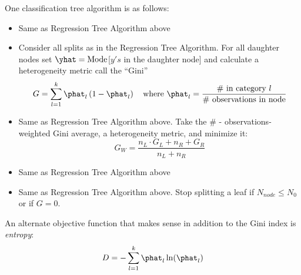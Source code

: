 \documentclass[12pt]{article}
\begin{document}
\begin{enumerate}
\begin{tcolorbox}[colback=white, sharp corners]
One classification tree algorithm is as follows:
\begin{itemize}
\item[\#1] Same as Regression Tree Algorithm above
\item[\#2] Consider all splits as in the Regression Tree Algorithm. For all daughter nodes set $\yhat = \text{Mode}$[$y's$ in the daughter node] and calculate a heterogeneity metric call the ``Gini''
\[
	G = \sum_{l = 1}^k \phat_l\left( 1 - \phat_l\right) \quad \text{where } \phat_l = \dfrac{\text{\# in category }l}{\# \text{ observations in node}}
\]
\item[\#3] Same as Regression Tree Algorithm above. Take the \# - observations-weighted Gini average, a heterogeneity metric, and minimize it:
\[
	G_{W} = \dfrac{n_L \cdot G_L + n_R + G_R}{n_L + n_R}
\]
\item[\#4] Same as Regression Tree Algorithm above
\item[\#5] Same as Regression Tree Algorithm above. Stop splitting a leaf if $N_{node} \leq N_0$ or if $G=0$.  
\end{itemize}
\end{tcolorbox}


\begin{tcolorbox}[colback=white, sharp corners]
An alternate objective function that makes sense in addition to the Gini index is \emph{entropy}:
\[
	D = - \sum_{l = 1}^k \phat_l \ln(\phat_l)
\]
\end{tcolorbox}

\end{enumerate}
\end{document}
